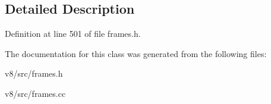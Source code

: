 \subsection{Detailed Description}


Definition at line 501 of file frames.\+h.



The documentation for this class was generated from the following files\+:\begin{DoxyCompactItemize}
\item 
v8/src/frames.\+h\item 
v8/src/frames.\+cc\end{DoxyCompactItemize}
